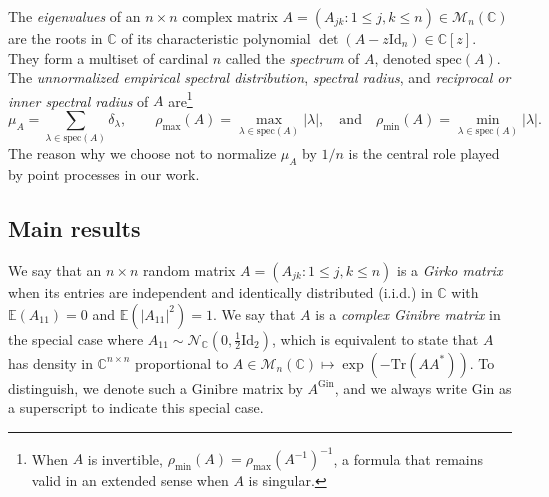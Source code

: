 \documentclass[10pt,reqno]{amsart}
\newcommand{\<}{\langle}
\renewcommand{\>}{\rangle}
\newcommand{\AG}{A^{\mathrm{Gin}}}
\numberwithin{equation}{section}
\begin{document}
The \emph{eigenvalues} of an $n\times n$ complex matrix
$A=(A_{jk}:1\leq j,k\leq n)\in\mathcal{M}_n(\mathbb{C})$ are the roots in
$\mathbb{C}$ of its characteristic polynomial
$\det(A-z\mathrm{Id}_n)\in\mathbb{C}[z]$. They form a multiset of cardinal $n$
called the \emph{spectrum} of $A$, denoted $\mathrm{spec}(A)$. The
\emph{unnormalized empirical spectral distribution}, \emph{spectral radius}, and
\emph{reciprocal or inner spectral radius} of $A$ are\footnote{When
  $A$ is invertible, $\rho_{\min}(A)=\rho_{\max}(A^{-1})^{-1}$, a formula
  that remains valid in an extended sense when $A$ is singular.}
\begin{equation}\label{def_esd}
\mu_A=\sum_{\lambda\in\mathrm{spec}(A)}\delta_{\lambda},
\qquad
\rho_{\max}(A)=\max_{\lambda\in\mathrm{spec}(A)}|\lambda|,
\quad\text{and}\quad
\rho_{\min}(A)=\min_{\lambda\in\mathrm{spec}(A)}|\lambda|.
\end{equation}
The reason why we choose not to normalize $\mu_A$ by $1/n$ is the central role played by point processes in our work.

\subsection{Main results}

We say that an $n\times n$ random matrix $A=(A_{jk}: 1\leq j,k\leq n)$ is a \emph{Girko matrix} when its entries are independent and identically distributed (i.i.d.) in $\mathbb{C}$ with $\mathbb{E}(A_{11})=0$ and $\mathbb{E}(|A_{11}|^2)=1$. We say that $A$ is a \emph{complex Ginibre matrix} in the special case where $A_{11}\sim\mathcal{N}_{\mathbb{C}}(0,\frac{1}{2}\mathrm{Id}_2)$, which is equivalent to state that $A$ has density in $\mathbb{C}^{n\times n}$ proportional to $A\in\mathcal{M}_n(\mathbb{C})\mapsto\exp(-\mathrm{Tr}(AA^*))$. To distinguish, we denote such a Ginibre matrix by $\AG$, and we always write $\mathrm{Gin}$ as a superscript to indicate this special case.
\end{document}
